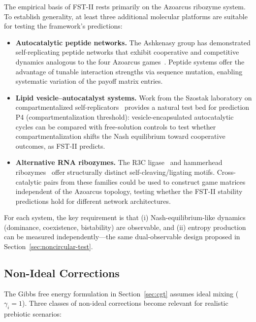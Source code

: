 \documentclass[12pt,a4paper]{article}
\theoremstyle{remark}
\begin{document}
The empirical basis of FST-II rests primarily on the Azoarcus ribozyme system. To establish generality, at least three additional molecular platforms are suitable for testing the framework's predictions:

\begin{itemize}
    \item \textbf{Autocatalytic peptide networks.} The Ashkenasy group has demonstrated self-replicating peptide networks that exhibit cooperative and competitive dynamics analogous to the four Azoarcus games~\citep{Ashkenasy2004}. Peptide systems offer the advantage of tunable interaction strengths via sequence mutation, enabling systematic variation of the payoff matrix entries.
    \item \textbf{Lipid vesicle--autocatalyst systems.} Work from the Szostak laboratory on compartmentalized self-replicators~\citep{Szostak2001} provides a natural test bed for prediction P4 (compartmentalization threshold): vesicle-encapsulated autocatalytic cycles can be compared with free-solution controls to test whether compartmentalization shifts the Nash equilibrium toward cooperative outcomes, as FST-II predicts.
    \item \textbf{Alternative RNA ribozymes.} The R3C ligase~\citep{Rogers2001} and hammerhead ribozymes~\citep{Hammerhead1986} offer structurally distinct self-cleaving/ligating motifs. Cross-catalytic pairs from these families could be used to construct game matrices independent of the Azoarcus topology, testing whether the FST-II stability predictions hold for different network architectures.
\end{itemize}

\noindent
For each system, the key requirement is that (i) Nash-equilibrium-like dynamics (dominance, coexistence, bistability) are observable, and (ii) entropy production can be measured independently---the same dual-observable design proposed in Section~\ref{sec:noncircular-test}.

\subsection{Non-Ideal Corrections}
\label{sec:nonideal-corrections}

The Gibbs free energy formulation in Section~\ref{sec:cgt} assumes ideal mixing ($\gamma_i = 1$). Three classes of non-ideal corrections become relevant for realistic prebiotic scenarios:
\end{document}

